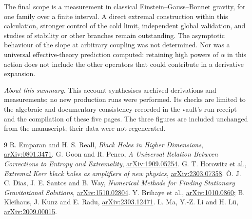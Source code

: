 \documentclass[11pt,a4paper]{article}
\newcommand{\arxiv}[1]{\href{https://arxiv.org/abs/#1}{arXiv:#1}}
\begin{document}
The final scope is a measurement in classical Einstein--Gauss--Bonnet gravity, for one family over a finite interval. A direct extremal construction within this calculation, stronger control of the cold limit, independent global validation, and studies of stability or other branches remain outstanding. The asymptotic behaviour of the slope at arbitrary coupling was not determined. Nor was a universal effective-theory prediction computed: retaining high powers of $\alpha$ in this action does not include the other operators that could contribute in a derivative expansion.

\smallskip
\noindent\textit{About this summary.} This account synthesises archived derivations and measurements; no new production runs were performed. Its checks are limited to the algebraic and documentary consistency recorded in the vault's run receipt and the compilation of these five pages. The three figures are included unchanged from the manuscript; their data were not regenerated.

\vspace{-3pt}
\begin{thebibliography}{9}\small\setlength{\itemsep}{0pt}\setlength{\parskip}{0pt}
 R. Emparan and H. S. Reall, \textit{Black Holes in Higher Dimensions}, \arxiv{0801.3471}.
 G. Goon and R. Penco, \textit{A Universal Relation Between Corrections to Entropy and Extremality}, \arxiv{1909.05254}.
 G. T. Horowitz et al., \textit{Extremal Kerr black holes as amplifiers of new physics}, \arxiv{2303.07358}.
 Ó. J. C. Dias, J. E. Santos and B. Way, \textit{Numerical Methods for Finding Stationary Gravitational Solutions}, \arxiv{1510.02804}.
 Y. Brihaye et al., \arxiv{1010.0860}; B. Kleihaus, J. Kunz and E. Radu, \arxiv{2303.12471}.
 L. Ma, Y.-Z. Li and H. Lü, \arxiv{2009.00015}.
\end{thebibliography}
\end{document}
